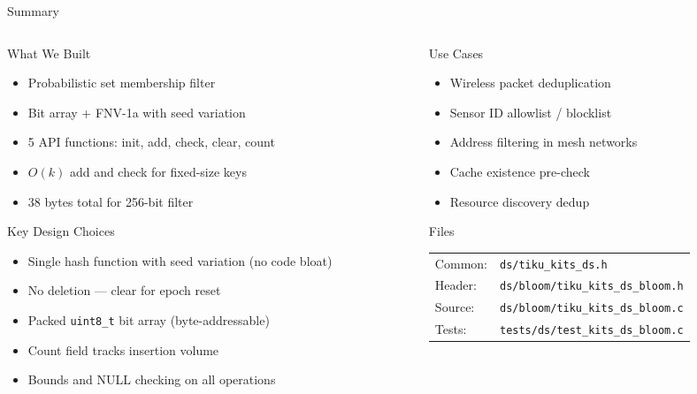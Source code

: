 \documentclass[aspectratio=169, 10pt]{beamer}
\begin{document}
\begin{frame}{Summary}
\begin{columns}[T]
\begin{column}{0.48\textwidth}
\begin{block}{What We Built}
\begin{itemize}
  \item Probabilistic set membership filter
  \item Bit array + FNV-1a with seed variation
  \item 5 API functions: init, add, check, clear, count
  \item $O(k)$ add and check for fixed-size keys
  \item 38 bytes total for 256-bit filter
\end{itemize}
\end{block}

\begin{block}{Key Design Choices}
\begin{itemize}
  \item Single hash function with seed variation (no code bloat)
  \item No deletion --- clear for epoch reset
  \item Packed \texttt{uint8\_t} bit array (byte-addressable)
  \item Count field tracks insertion volume
  \item Bounds and NULL checking on all operations
\end{itemize}
\end{block}
\end{column}

\begin{column}{0.48\textwidth}
\begin{block}{Use Cases}
\begin{itemize}
  \item Wireless packet deduplication
  \item Sensor ID allowlist / blocklist
  \item Address filtering in mesh networks
  \item Cache existence pre-check
  \item Resource discovery dedup
\end{itemize}
\end{block}

\begin{block}{Files}
\scriptsize
\begin{tabular}{@{}lp{4.5cm}@{}}
Common: & \texttt{ds/tiku\_kits\_ds.h} \\
Header: & \texttt{ds/bloom/tiku\_kits\_ds\_bloom.h} \\
Source: & \texttt{ds/bloom/tiku\_kits\_ds\_bloom.c} \\
Tests:  & \texttt{tests/ds/test\_kits\_ds\_bloom.c} \\
\end{tabular}
\end{block}
\end{column}
\end{columns}
\end{frame}
\end{document}
